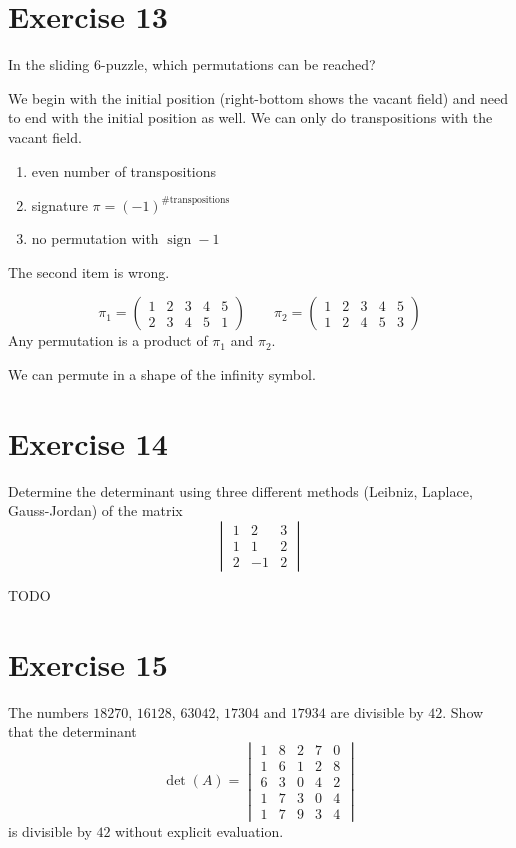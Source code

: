 \documentclass[a4paper]{article}
\theoremstyle{definition}
\DeclareMathOperator\sign{sign}
\begin{document}
\section{Exercise 13}
\begin{ex}
  In the sliding 6-puzzle, which permutations can be reached?
\end{ex}

We begin with the initial position (right-bottom shows the vacant field) and need to end with the initial position as well.
We can only do transpositions with the vacant field.
\begin{enumerate}
  \item even number of transpositions
  \item signature $\pi = (-1)^{\text{\# transpositions}}$
  \item no permutation with $\sign - 1$
\end{enumerate}

The second item is wrong.

\[
  \pi_1 = \begin{pmatrix} 1 & 2 & 3 & 4 & 5 \\ 2 & 3 & 4 & 5 & 1 \end{pmatrix} \qquad
  \pi_2 = \begin{pmatrix} 1 & 2 & 3 & 4 & 5 \\ 1 & 2 & 4 & 5 & 3 \end{pmatrix}
\]
Any permutation is a product of $\pi_1$ and $\pi_2$.

We can permute in a shape of the infinity symbol.

\section{Exercise 14}
\begin{ex}
  Determine the determinant using three different methods (Leibniz, Laplace, Gauss-Jordan) of the matrix
  \[
    \begin{vmatrix}
      1 & 2 & 3 \\
      1 & 1 & 2 \\
      2 & -1 & 2
    \end{vmatrix}
  \]
\end{ex}

TODO

\section{Exercise 15}
\begin{ex}
  The numbers $18270$, $16128$, $63042$, $17304$ and $17934$ are divisible by $42$.
  Show that the determinant
  \[
    \det(A) = \begin{vmatrix}
      1 & 8 & 2 & 7 & 0 \\
      1 & 6 & 1 & 2 & 8 \\
      6 & 3 & 0 & 4 & 2 \\
      1 & 7 & 3 & 0 & 4 \\
      1 & 7 & 9 & 3 & 4
    \end{vmatrix}
  \]
  is divisible by $42$ without explicit evaluation.
\end{ex}
\end{document}
